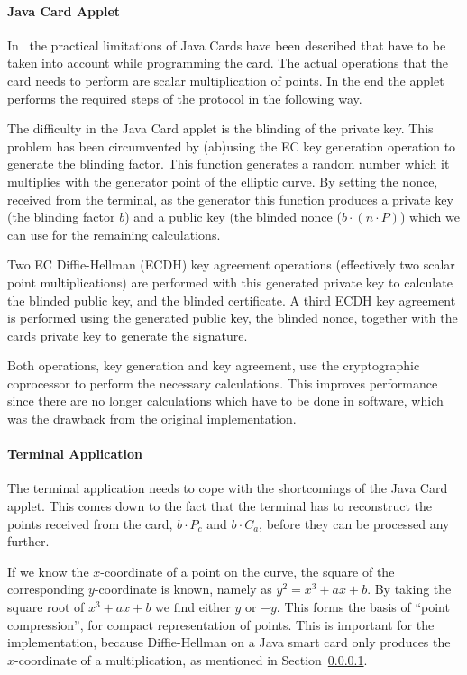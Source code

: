 \paragraph{Java Card Applet}\label{sec:applet}

In~\cite{BatinaHJMV10} the practical limitations of Java Cards have
been described that have to be taken into account while programming
the card. The actual operations that the card needs to perform are
scalar multiplication of points. In the end the applet performs the
required steps of the protocol in the following way.

The difficulty in the Java Card applet is the blinding of the private
key. This problem has been circumvented by (ab)using the EC key
generation operation to generate the blinding factor. This function
generates a random number which it multiplies with the generator point
of the elliptic curve. By setting the nonce, received from the
terminal, as the generator this function produces a private key (the
blinding factor $b$) and a public key (the blinded nonce ($b\cdot
(n\cdot P)$) which we can use for the remaining calculations.

Two EC Diffie-Hellman (ECDH) key agreement operations (effectively two scalar
point
multiplications) are performed with this generated private key to
calculate the blinded public key, and the blinded certificate. A third
ECDH key agreement is performed using the generated public key, the blinded
nonce, together with the cards private key to generate the signature.

Both operations, key generation and key agreement, use the
cryptographic coprocessor to perform the necessary calculations. This
improves performance since there are no longer calculations which have
to be done in software, which was the drawback from the original
implementation.

\paragraph{Terminal Application}\label{sec:application}

The terminal application needs to cope with the shortcomings of the Java Card
applet. This comes down to the fact that the terminal has to reconstruct the
points received from the card, $b\cdot P_c$ and $b\cdot C_a$, before they can
be processed any further.

If we know the $x$-coordinate of a point on the curve, the square of the
corresponding $y$-coordinate is known, namely as $y^{2} = x^{3} + ax + b$.
By taking the square root of $x^{3} + ax + b$ we find either $y$ or $-y$.
This forms the basis of ``point compression'', for compact representation
of points.  This is important for the implementation, because Diffie-Hellman
on a Java smart card only produces the $x$-coordinate of a multiplication,
as mentioned in Section~\ref{sec:applet}.

